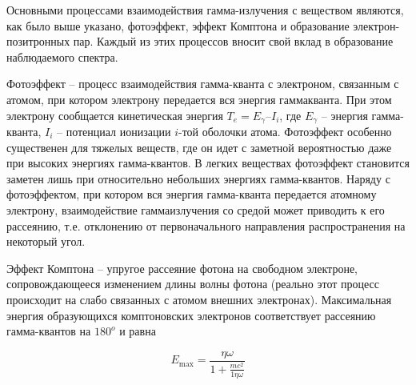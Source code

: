 Основными процессами взаимодействия гамма-излучения с веществом являются, как
было выше указано, фотоэффект, эффект Комптона и образование
электрон-позитронных пар. Каждый из этих процессов вносит свой вклад в
образование наблюдаемого спектра.

Фотоэффект – процесс взаимодействия гамма-кванта с электроном, связанным с
атомом, при котором электрону передается вся энергия гаммакванта. При этом
электрону сообщается кинетическая энергия $T_e = E_{\gamma} – I_i$, где
$E_{\gamma}$ – энергия гамма-кванта, $I_i$ – потенциал ионизации $i$-той
оболочки атома. Фотоэффект особенно существенен для тяжелых веществ, где он идет
с заметной вероятностью даже при высоких энергиях гамма-квантов. В легких
веществах фотоэффект становится заметен лишь при относительно небольших энергиях
гамма-квантов. Наряду с фотоэффектом, при котором вся энергия гамма-кванта
передается атомному электрону, взаимодействие гаммаизлучения со средой может
приводить к его рассеянию, т.е. отклонению от первоначального направления
распространения на некоторый угол.

Эффект Комптона – упругое рассеяние фотона на свободном электроне,
сопровождающееся изменением длины волны фотона (реально этот процесс происходит
на слабо связанных с атомом внешних электронах). Максимальная энергия
образующихся комптоновских электронов соответствует рассеянию гамма-квантов на
$180^o$ и равна

\begin{equation}
  E_{\max} = \frac{\eta \omega}{1 + \frac{m c^2}{1 \eta \omega}}
\end{equation}
